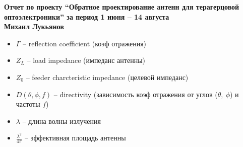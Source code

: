\documentclass[a4paper, 12pt]{article}
\begin{document}
\newcommand{\listOn}{\begin{itemize}\setlength\itemsep{0pt}}
\newcommand{\listOff}{\end{itemize}}

\newcommand{\listNumOn}{\begin{enumerate}\setlength\itemsep{0pt}}
\newcommand{\listNumOff}{\end{enumerate}}

\newcommand{\pic}[5]
{
\begin{figure}[#1]
\begin{center}
\begin{minipage}{0.95\linewidth}
    \texttt{[image: \#3]}
    \caption{#4}
    \label{#5}
\end{minipage}
\end{center}
\end{figure}
}

\begin{center}
    \large
    \bfseries
    Отчет по проекту ``Обратное проектирование антенн для терагерцовой оптоэлектроники'' за период 1 июня -- 14 августа \\
    \normalfont
    Михаил Лукьянов \\
\end{center}



\listOn
\item $\Gamma$ -- reflection coefficient (коэф отражения)
\item $Z_L$ -- load impedance (импеданс антенны)
\item $Z_0$ -- feeder charcteristic impedance (целевой импеданс)
\item $D(\theta, \phi, f)$ -- directivity (зависимость коэф отражения от углов ($\theta,\ \phi$) и частоты $f$)
\item $\lambda$ -- длина волны излучения
\item $\frac{\lambda^2}{4 \pi}$ -- эффективная площадь антенны
\listOff
\end{document}
